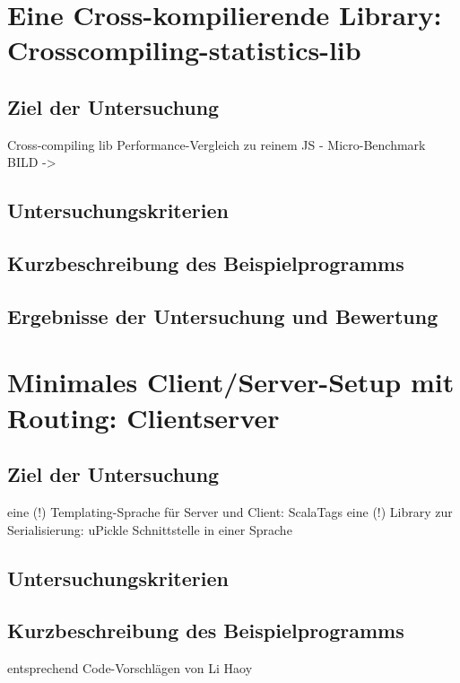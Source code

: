 \documentclass[a4paper, 12pt, hidelinks, listof=totoc, listoftables=totoc, bibliography=totoc]{scrreprt}
\begin{document}
\section{Eine Cross-kompilierende Library: Crosscompiling-statistics-lib}


\subsection{Ziel der Untersuchung}
Cross-compiling lib
Performance-Vergleich zu reinem JS - Micro-Benchmark
BILD -> \cite[Folie 52, Min. ???]{doeraene2015.SSP} %

\subsection{Untersuchungskriterien}
\subsection{Kurzbeschreibung des Beispielprogramms}
\subsection{Ergebnisse der Untersuchung und Bewertung}


\section{Minimales Client/Server-Setup mit Routing: Clientserver}


\subsection{Ziel der Untersuchung}
eine (!) Templating-Sprache für Server und Client: ScalaTags \cite{haoyi.HOS}
eine (!) Library zur Serialisierung: uPickle \cite{haoyi.HOS}
Schnittstelle in einer Sprache

\subsection{Untersuchungskriterien}
\subsection{Kurzbeschreibung des Beispielprogramms}
entsprechend Code-Vorschlägen von Li Haoy\cite{haoyi.HOS}
\end{document}
